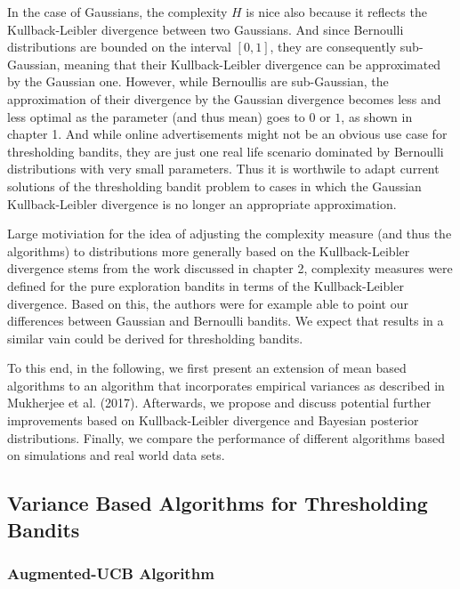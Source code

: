 \documentclass[12pt,]{article}
\begin{document}
In the case of Gaussians, the complexity \(H\) is nice also because it
reflects the Kullback-Leibler divergence between two Gaussians. And
since Bernoulli distributions are bounded on the interval \([0,1]\),
they are consequently sub-Gaussian, meaning that their Kullback-Leibler
divergence can be approximated by the Gaussian one. However, while
Bernoullis are sub-Gaussian, the approximation of their divergence by
the Gaussian divergence becomes less and less optimal as the parameter
(and thus mean) goes to \(0\) or \(1\), as shown in chapter 1. And while
online advertisements might not be an obvious use case for thresholding
bandits, they are just one real life scenario dominated by Bernoulli
distributions with very small parameters. Thus it is worthwile to adapt
current solutions of the thresholding bandit problem to cases in which
the Gaussian Kullback-Leibler divergence is no longer an appropriate
approximation.

Large motiviation for the idea of adjusting the complexity measure (and
thus the algorithms) to distributions more generally based on the
Kullback-Leibler divergence stems from the work discussed in chapter 2,
complexity measures were defined for the pure exploration bandits in
terms of the Kullback-Leibler divergence. Based on this, the authors
were for example able to point our differences between Gaussian and
Bernoulli bandits. We expect that results in a similar vain could be
derived for thresholding bandits.

To this end, in the following, we first present an extension of mean
based algorithms to an algorithm that incorporates empirical variances
as described in Mukherjee et al. (2017). Afterwards, we propose and
discuss potential further improvements based on Kullback-Leibler
divergence and Bayesian posterior distributions. Finally, we compare the
performance of different algorithms based on simulations and real world
data sets.

\subsection{Variance Based Algorithms for Thresholding
Bandits}\label{variance-based-algorithms-for-thresholding-bandits}

\subsubsection{Augmented-UCB Algorithm}\label{augmented-ucb-algorithm}
\end{document}
